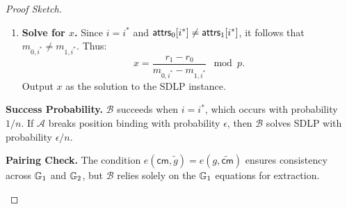 \begin{proof}[Proof Sketch]
\begin{enumerate}
\begin{enumerate}
        \item \textbf{Solve for $x$.} Since $i = i^*$ and $\mathsf{attrs}_0[i^*] \neq \mathsf{attrs}_1[i^*]$, it follows that $m_{0,i^*} \neq m_{1,i^*}$. Thus:
        $$x = \frac{r_1 - r_0}{m_{0,i^*} - m_{1,i^*}} \mod p.$$
        Output $x$ as the solution to the SDLP instance.
    \end{enumerate}

    \textbf{Success Probability.} $\mathcal{B}$ succeeds when $i = i^*$, which occurs with probability $1/n$. If $\mathcal{A}$ breaks position binding with probability $\epsilon$, then $\mathcal{B}$ solves SDLP with probability $\epsilon / n$.

\textbf{Pairing Check.} The condition $e(\mathsf{cm}, \tilde{g}) = e(g, \widetilde{\mathsf{cm}})$ ensures consistency across $\mathbb{G}_1$ and $\mathbb{G}_2$, but $\mathcal{B}$ relies solely on the $\mathbb{G}_1$ equations for extraction.
\end{enumerate}
\end{proof}





    
    
